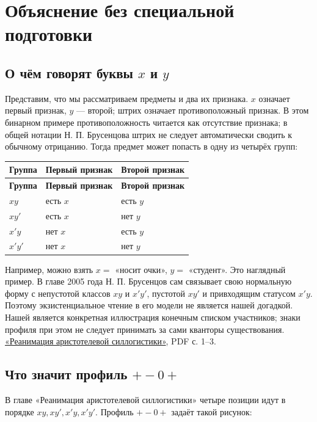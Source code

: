 \documentclass[12pt,a4paper]{article}
\begin{document}
\section{Объяснение без специальной подготовки}

\subsection{О чём говорят буквы \(x\) и \(y\)}

Представим, что мы рассматриваем предметы и два их признака. \(x\) означает первый признак, \(y\) — второй; штрих означает противоположный признак. В этом бинарном примере противоположность читается как отсутствие признака; в общей нотации Н. П. Брусенцова штрих не следует автоматически сводить к обычному отрицанию. Тогда предмет может попасть в одну из четырёх групп:

\begin{longtable}{P{0.260\textwidth}P{0.300\textwidth}P{0.360\textwidth}}
\toprule
\textbf{Группа} & \textbf{Первый признак} & \textbf{Второй признак} \\
\midrule
\endfirsthead
\toprule
\textbf{Группа} & \textbf{Первый признак} & \textbf{Второй признак} \\
\midrule
\endhead
\(xy\) & есть \(x\) & есть \(y\) \\
\(xy'\) & есть \(x\) & нет \(y\) \\
\(x'y\) & нет \(x\) & есть \(y\) \\
\(x'y'\) & нет \(x\) & нет \(y\) \\
\bottomrule
\end{longtable}

Например, можно взять \(x=\) «носит очки», \(y=\) «студент». Это наглядный пример. В главе 2005 года Н. П. Брусенцов сам связывает свою нормальную форму с непустотой классов \(xy\) и \(x'y'\), пустотой \(xy'\) и привходящим статусом \(x'y\). Поэтому экзистенциальное чтение в его модели не является нашей догадкой. Нашей является конкретная иллюстрация конечным списком участников; знаки профиля при этом не следует принимать за сами кванторы существования. \href{https://ternarycomp.cs.msu.ru/Papers/Rea.pdf}{«Реанимация аристотелевой силлогистики»}, PDF с. 1–3.

\subsection{Что значит профиль \(+-0+\)}

В главе «Реанимация аристотелевой силлогистики» четыре позиции идут в порядке \(xy,xy',x'y,x'y'\). Профиль \(+-0+\) задаёт такой рисунок:
\end{document}
